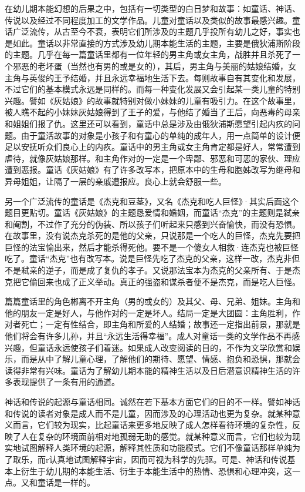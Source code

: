 \documentclass[UTF8,10pt,a4paper,openany]{book}
\begin{document}
在幼儿期本能幻想的后果之中，包括有一切类型的白日梦和故事：如童话、神话、传说以及经过不同程度加工的文学作品。儿童对童话以及类似的故事最感兴趣。童话广泛流传，从古至今不衰，表明它们所涉及的主题几乎投所有幼儿之好，事实也是如此。童话以非常直接的方式涉及幼儿期本能生活的主题，主要是俄狄浦斯阶段的主题。几乎在每一篇童话里都有一位年轻的男主角或女主角，战胜并且杀死了一个邪恶的老坏蛋（当然也有男的或是女的），其后，男主角与美丽的姑娘结婚，女主角与英俊的王予结婚，并且永远幸福地生活下去。每则故事自有其变化和发展，不过它们的基本模式永远是同样的。而每一种变化发展又会引起某一类儿童的特别兴趣。譬如《灰姑娘》的故事就特别对做小妹妹的儿童有吸引力。在这个故事里，被人瞧不起的小妹妹灰姑娘得到了王子的爱，与他结了婚当了王后，向恶毒的母亲和姐姐们报了仇。这里还可以看到，童话中总是涉及由俄狄浦斯愿望引起内疚的问题。由于童活故事的对象是小孩子和有童心的单纯的成年人，用一点简单的设计便足以安抚听众们良心上的内疚。童话中的男主角或女主角肯定都是好人，常常遭到虐待，就像灰姑娘那样。和主角作对的一定是一个卑鄙、邪恶和可恶的家伙、理应遭到恶报。童话《灰姑娘》有了许多改写本，把原本中的生母和胞姊改写为继母和异母姐姐，让隔了一层的亲戚遭报应。良心上就会舒服一些。

另一个广泛流传的童话是《杰克和豆茎》，又名《杰克和吃人巨怪》·其实后面这个题目更贴切。童话《灰姑娘》的主题恳爱情和婚姻，而童话“杰克”的主题则是弑亲和阉割，不过作了充分的伪装、所以孩子们听起来只感到兴奋愉快，而没有恐惧。在故事里，没有说杰克杀死的是他的父亲，只说那是一个吃人的巨怪，杰克先要把巨怪的法宝愉出来，然后才能杀得死他。要不是一个傻女人相救·连杰克也被巨怪吃了。童话“杰克”也有改写本。说是巨怪先吃了杰克的父亲，这样一改，杰克非但不是弒亲的逆子，而是成了复仇的孝子。又说那法宝本为杰克的父亲所有、于是杰克把它偷回来也成了正义举动。真正的强盗和谋杀者便不是杰克，而是吃人巨怪。

篇篇童话里的角色郴离不开主角（男的或女的）及其父、母、兄弟、姐妹。主角和他的朋友一定是好人，与他作对的一定是坏人。结局一定是大团圆：主角胜利，作对者死亡；一定有性结合，即主角和所爱的人结婚；故事还一定指出前景，那就是他们将会有许多儿孙，并且“永远生活得幸福”。成人对童话一类的文学作品不再感兴趣，但童话永远使孩子们着迷。如果成人改变阅读的目的，不作为文学欣赏和娱乐，而是从中了解儿童心理，了解他们的期待、愿望、情感、抱负和恐惧，那就会读得非常有兴味。童话为了解幼儿期本能的精神生活以及日后潜意识精神生活的许多表现提供了一条有用的通道。

神话和传说的起源与童话相同。诚然在若下基本方面它们的目的不一样。譬如神话和传说的读者对象是成人而不是儿童，因而涉及的心理活动也更为复杂。就某种意义而言，它们较为现实，比起童话来更多地反映了成人怎样看待环境的复杂性，反映了人在复杂的环境面前相对地孤弱无助的感觉。就某种意义而言，它们也较为现实地试图解释人类环境的起源，解释其性质和功能模式。它们不像童话那样单纯为了取乐，而r认真地试图解释宇宙，因而可视为科学的先驱。可是、神话和传说基本上衍生于幼儿期的本能生活、衍生于本能生活中的热情、恐惧和心理冲突，这一点。又和童话是一样的。
\end{document}
